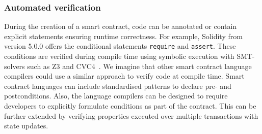 
\subsubsection{Automated verification}
During the creation of a smart contract, code can be annotated or contain explicit statements ensuring runtime correctness.
For example, Solidity from version 5.0.0 offers the conditional statements \texttt{require} and \texttt{assert}.
These conditions are verified during compile time using symbolic execution with SMT-solvers such as Z3 and CVC4~\cite{Alt2018}.
We imagine that other smart contract language compilers could use a similar approach to verify code at compile time.
Smart contract languages can include standardised patterns to declare pre- and postconditions.
Also, the language compilers  can be designed to require developers to explicitly formulate conditions as part of the contract.
This can be further extended by verifying properties executed over multiple transactions with state updates.

